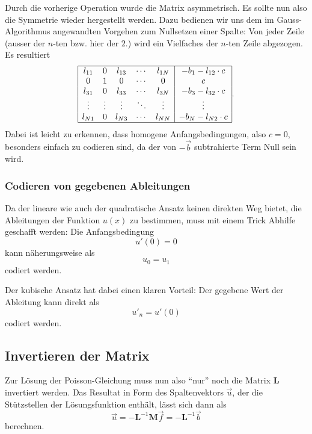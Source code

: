Durch die vorherige Operation wurde die Matrix asymmetrisch. 
Es sollte nun also die Symmetrie wieder hergestellt werden.
Dazu bedienen wir uns dem im Gauss-Algorithmus angewandten Vorgehen zum Nullsetzen einer Spalte: Von jeder Zeile (ausser der $n$-ten bzw. hier der $2$.) wird ein Vielfaches der $n$-ten Zeile abgezogen.
Es resultiert
\begin{equation}
        \begin{array}{|ccccc|c|}
            \hline
            l_{11} & 0      & l_{13} & \cdots & l_{1N} & -b_1 - l_{12} \cdot c \\
            0      & 1      & 0      & \cdots & 0      & c                     \\
            l_{31} & 0      & l_{33} & \cdots & l_{3N} & -b_3 - l_{32} \cdot c \\
            \vdots & \vdots & \vdots & \ddots & \vdots & \vdots                \\
            l_{N1} & 0      & l_{N3} & \cdots & l_{NN} & -b_N - l_{N2} \cdot c \\
            \hline
        \end{array}.
\end{equation}
Dabei ist leicht zu erkennen, dass homogene Anfangsbedingungen, also $c=0$, besonders einfach zu codieren sind, da der von $-\vec{b}$ subtrahierte Term Null sein wird.

\subsubsection{Codieren von gegebenen Ableitungen}
Da der lineare wie auch der quadratische Ansatz keinen direkten Weg bietet, die Ableitungen der Funktion $u(x)$ zu bestimmen, muss mit einem Trick Abhilfe geschafft werden: 
Die Anfangsbedingung
\begin{equation}
    u'(0) = 0
\end{equation}
kann näherungsweise als 
\begin{equation}
    u_0 = u_1
\end{equation}
codiert werden. 

Der kubische Ansatz hat dabei einen klaren Vorteil: 
Der gegebene Wert der Ableitung kann direkt als 
\begin{equation}
    u'_n = u'(0)
\end{equation}
codiert werden.


\subsection{Invertieren der Matrix\label{fem:1d:matrix_invertieren}}
Zur Lösung der Poisson-Gleichung muss nun also ``nur'' noch die Matrix $\mathbf{L}$ invertiert werden.
Das Resultat in Form des Spaltenvektors $\vec{u}$, der die Stützstellen der Lösungsfunktion enthält, lässt sich dann als
\begin{equation}
    \vec{u} = - \mathbf{L}^{-1}\mathbf{M}\vec{f} = - \mathbf{L}^{-1}\vec{b}
\end{equation}
berechnen.

